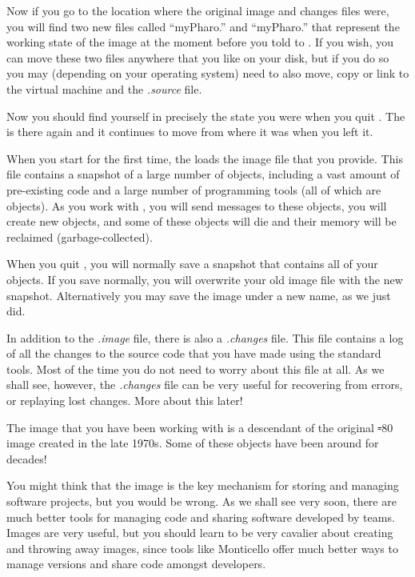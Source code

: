 \documentclass[a4paper,10pt,twoside]{book}
\begin{document}
Now if you go to the location where the original image and changes files were, you will find two new files called ``myPharo.'' and ``myPharo.'' that represent the working state of the \pharo image at the moment before you told \pharo to .
If you wish, you can move these two files anywhere that you like on your disk, but if you do so you may (depending on your operating system) need to also move, copy or link to the virtual machine and the \emph{.source} file.


Now you should find yourself in precisely the state you were when you quit \pharo. The \bam is there again and it continues to move from where it was when you left it.

When you start \pharo for the first time, the \pharo {} loads the image file that you provide. This file contains a snapshot of a large number of objects, including a vast amount of pre-existing code and a large number of programming tools (all of which are objects). As you work with \pharo, you will send messages to these objects, you will create new objects, and some of these objects will die and their memory will be reclaimed (\ie garbage-collected).

When you quit \pharo, you will normally save a snapshot that contains all of your objects.  If you save normally, you will overwrite your old image file with the new snapshot. Alternatively you may save the image under a new name, as we just did.

In addition to the \emph{.image} file, there is also a \emph{.changes} file.
This file contains a log of all the changes to the source code that you have made using the standard tools.
Most of the time you do not need to worry about this file at all.
As we shall see, however, the \emph{.changes} file can be very useful for recovering from errors, or replaying lost changes.
More about this later!

The image that you have been working with is a descendant of the original \st-80 image created in the late 1970s.
Some of these objects have been around for decades!

You might think that the image is the key mechanism for storing and managing software projects, but you would be wrong.
As we shall see very soon, there are much better tools for managing code and sharing software developed by teams.
Images are very useful, but you should learn to be very cavalier about creating and throwing away images, since tools like Monticello offer much better ways to manage versions and share code amongst developers.
\end{document}
